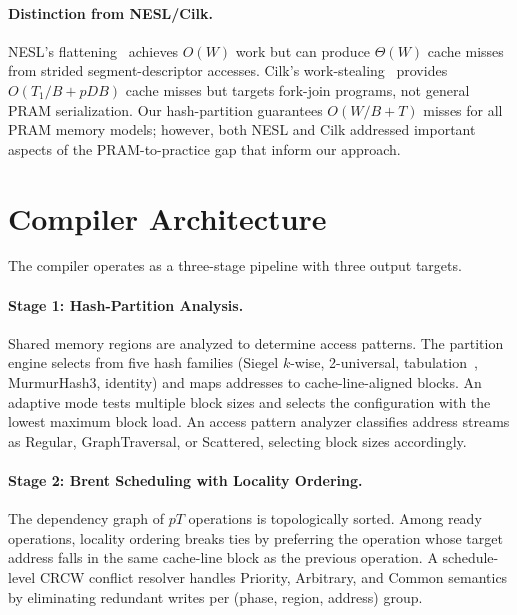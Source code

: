 \documentclass[11pt]{article}
\begin{document}
\paragraph{Distinction from NESL/Cilk.}
NESL's flattening~\cite{blelloch1996programming} achieves $O(W)$ work
but can produce $\Theta(W)$ cache misses from strided segment-descriptor
accesses.  Cilk's work-stealing~\cite{frigo1998implementation} provides
$O(T_1/B + pDB)$ cache misses but targets fork-join programs, not
general PRAM serialization.  Our hash-partition guarantees $O(W/B + T)$
misses for all PRAM memory models; however, both NESL and Cilk addressed
important aspects of the PRAM-to-practice gap that inform our approach.

\section{Compiler Architecture}
\label{sec:compiler}

The compiler operates as a three-stage pipeline with three output targets.

\paragraph{Stage 1: Hash-Partition Analysis.}
Shared memory regions are analyzed to determine access patterns.
The partition engine selects from five hash families (Siegel $k$-wise,
2-universal, tabulation~\cite{patrascu2012power}, MurmurHash3, identity)
and maps addresses to cache-line-aligned blocks.  An adaptive mode tests
multiple block sizes and selects the configuration with the lowest
maximum block load.  An access pattern analyzer classifies address
streams as Regular, GraphTraversal, or Scattered, selecting block sizes
accordingly.

\paragraph{Stage 2: Brent Scheduling with Locality Ordering.}
The dependency graph of $pT$ operations is topologically sorted.
Among ready operations, locality ordering breaks ties by preferring
the operation whose target address falls in the same cache-line block
as the previous operation.  A schedule-level CRCW conflict resolver
handles Priority, Arbitrary, and Common semantics by eliminating
redundant writes per (phase, region, address) group.
\end{document}
